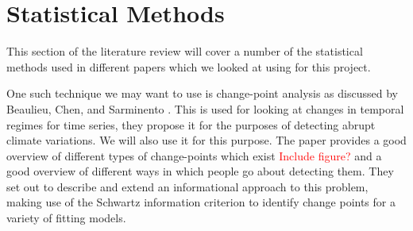 \section{Statistical Methods}
This section of the literature review will cover a number of the statistical methods used in different papers which we looked at using for this project. 
\medskip

One such technique we may want to use is change-point analysis as discussed by Beaulieu, Chen, and Sarminento \cite{Beaulieu2012}.
This is used for looking at changes in temporal regimes for time series, they propose it for the purposes of detecting abrupt climate variations. We will also use it for this purpose. The paper provides a good overview of different types of change-points which exist  \textcolor{red}{Include figure?} and a good overview of different ways in which people go about detecting them. They set out to describe and extend an informational approach to this problem, making use of the Schwartz information criterion to identify change points for a variety of fitting models.